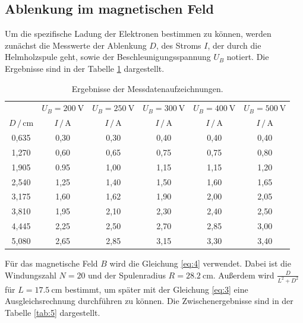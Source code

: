 \subsection{Ablenkung im magnetischen Feld}
Um die spezifische Ladung der Elektronen bestimmen zu können, werden zunächst
die Messwerte der Ablenkung $D$, des Stroms $I$, der durch die Helmholzspule geht, sowie der
Beschleunigungsspannung $U_B$ notiert.
Die Ergebnisse sind in der Tabelle \ref{tab:4} dargestellt.
\begin{table}[H]
  \centering
  \caption{Ergebnisse der Messdatenaufzeichnungen.}
  \label{tab:4}
  \begin{tabular}{c c c c c c}
\toprule
& \multicolumn{1}{c}{$U_B=\SI{200}{\volt}$} & \multicolumn{1}{c}{$U_B=\SI{250}{\volt}$} &\multicolumn{1}{c}{$U_B=\SI{300}{\volt}$}&\multicolumn{1}{c}{$U_B=\SI{400}{\volt}$}&\multicolumn{1}{c}{$U_B=\SI{500}{\volt}$}\\
\cmidrule(lr){2-2}\cmidrule(lr){3-3}\cmidrule(lr){4-4}\cmidrule(lr){5-5}\cmidrule(lr){6-6}
$D \, / \, \si{\centi\meter}$ & $I \, / \, \si{\ampere}$ & $I \, / \, \si{\ampere}$ & $I \, / \, \si{\ampere}$ &$I \, / \, \si{\ampere}$ & $I \, / \, \si{\ampere}$\\
\midrule
0,635 & 0,30  & 0,30 & 0,40 & 0,40& 0,40\\
1,270 & 0,60  & 0,65 & 0,75 & 0,75& 0,80\\
1,905 & 0.95  & 1,00 & 1,15 & 1,15& 1,20\\
2,540 & 1,25  & 1,40 & 1,50 & 1,60& 1,65\\
3,175 & 1,60  & 1,62 & 1,90 & 2,00& 2,05\\
3,810 & 1,95  & 2,10 & 2,30 & 2,40& 2,50\\
4,445 & 2,25  & 2,50 & 2,70 & 2,85& 3,00\\
5,080 & 2,65  & 2,85 & 3,15 & 3,30& 3,40\\
\bottomrule
  \end{tabular}
\end{table}
Für das magnetische Feld $B$ wird die Gleichung \ref{eq:4} verwendet. Dabei ist die
Windungszahl $N = 20 $ und der Spulenradius $R = \SI{28.2}{\centi\meter}$.
Außerdem wird $\frac{D}{L^2+D^2}$ für $L = \SI{17.5}{\centi\meter}$ bestimmt, um später
mit der Gleichung \ref{eq:3} eine Ausgleichsrechnung durchführen zu können.
Die Zwischenergebnisse sind in der Tabelle \ref{tab:5} dargestellt.
